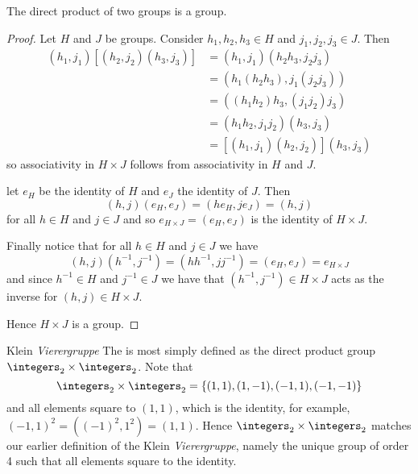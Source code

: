 \documentclass[fleqn]{NotesClass}
\begin{document}
    \begin{thm}{}{}
        The direct product of two groups is a group.
        
        \begin{proof}
            Let \(H\) and \(J\) be groups.
            Consider \(h_1, h_2, h_3 \in H\) and \(j_1, j_2, j_3 \in J\).
            Then
            \begin{align}
                (h_1, j_1)[(h_2, j_2)(h_3, j_3)] &= (h_1, j_1)(h_2h_3, j_2j_3)\\
                &= (h_1(h_2h_3), j_1(j_2j_3))\\
                &= ((h_1h_2)h_3, (j_1j_2)j_3)\\
                &= (h_1h_2, j_1j_2)(h_3, j_3)\\
                &= [(h_1, j_1)(h_2, j_2)](h_3, j_3)
            \end{align}
            so associativity in \(H\times J\) follows from associativity in \(H\) and \(J\).
            
            let \(e_H\) be the identity of \(H\) and \(e_J\) the identity of \(J\).
            Then
            \begin{equation}
                (h, j) (e_H, e_J) = (he_H, je_J) = (h, j)
            \end{equation}
            for all \(h \in H\) and \(j \in J\) and so \(e_{H\times J} = (e_H, e_J)\) is the identity of \(H \times J\).
            
            Finally notice that for all \(h \in H\) and \(j \in J\) we have
            \begin{equation}
                (h, j)(h^{-1}, j^{-1}) = (hh^{-1}, jj^{-1}) = (e_H, e_J) = e_{H\times J}
            \end{equation}
            and since \(h^{-1} \in H\) and \(j^{-1} \in J\) we have that \((h^{-1}, j^{-1}) \in H\times J\) acts as the inverse for \((h, j) \in H \times J\).
            
            Hence \(H \times J\) is a group.
        \end{proof}
    \end{thm}

    \begin{exm}{Klein \textit{Vierergruppe}}{}
        The  is most simply defined as the direct product group \(\integers_2 \times \integers_2\).
        Note that
        \begin{equation}
            \integers_2 \times \integers_2 = \{(1, 1), (1, -1), (-1, 1), (-1, -1)\}
        \end{equation}
        and all elements square to \((1, 1)\), which is the identity, for example, \((-1, 1)^2 = ((-1)^2, 1^2) = (1, 1)\).
        Hence \(\integers_2 \times \integers_2\) matches our earlier definition of the Klein \textit{Vierergruppe}, namely the unique group of order 4 such that all elements square to the identity.
    \end{exm}
\end{document}
